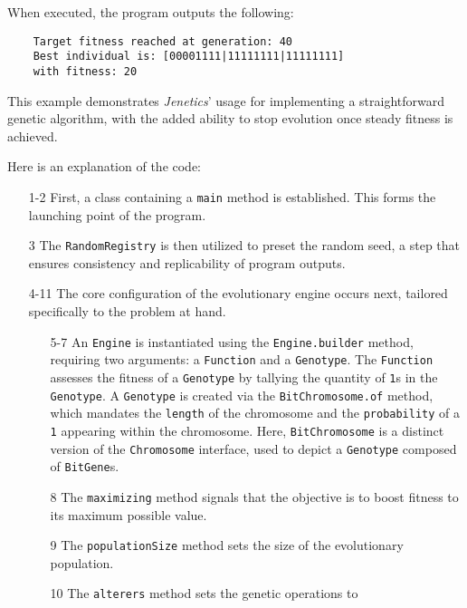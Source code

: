   When executed, the program outputs the following:

  \begin{verbatim}
    Target fitness reached at generation: 40
    Best individual is: [00001111|11111111|11111111]
    with fitness: 20
  \end{verbatim}

  This example demonstrates \textit{Jenetics}' usage for implementing a straightforward
  genetic algorithm, with the added ability to stop evolution once steady
  fitness is achieved.

  Here is an explanation of the code:

  \begin{enumerate}
    \item[1-2] First, a class containing a \texttt{main} method is established.
      This forms the launching point of the program.
    \item[3] The \texttt{RandomRegistry} is then utilized to preset the random 
      seed, a step that ensures consistency and replicability of program 
      outputs.
    \item[4-11] The core configuration of the evolutionary engine occurs next, 
      tailored specifically to the problem at hand.
      \begin{enumerate}
        \item[5-7] An \texttt{Engine} is instantiated using the 
          \texttt{Engine.builder} method, requiring two arguments: a 
          \texttt{Function} and a \texttt{Genotype}.
          The \texttt{Function} assesses the fitness of a \texttt{Genotype} by 
          tallying the quantity of \texttt{1}s in the \texttt{Genotype}.
          A \texttt{Genotype} is created via the \texttt{BitChromosome.of} 
          method, which mandates the \texttt{length} of the chromosome and the 
          \texttt{probability} of a \texttt{1} appearing within the chromosome.
          Here, \texttt{BitChromosome} is a distinct version of the 
          \texttt{Chromosome} interface, used to depict a \texttt{Genotype} 
          composed of \texttt{BitGene}s.
        \item[8] The \texttt{maximizing} method signals that the objective is 
          to boost fitness to its maximum possible value.
        \item[9] The \texttt{populationSize} method sets the size of the 
          evolutionary population.
        \item[10] The \texttt{alterers} method sets the genetic operations to 

\end{enumerate}
\end{enumerate}
